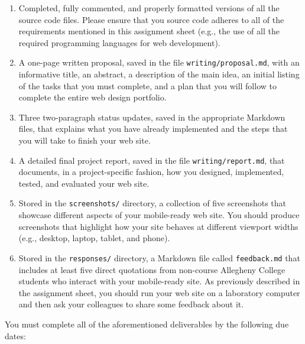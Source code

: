 \documentclass[11pt]{article}
\newcommand{\program}[1]{\lstinline{#1}}
\begin{document}
\begin{enumerate}

  \setlength{\itemsep}{0in}

\item Completed, fully commented, and properly formatted versions of all the
  source code files. Please ensure that you source code adheres to all of the
  requirements mentioned in this assignment sheet (e.g., the use of all the
  required programming languages for web development).

\item A one-page written proposal, saved in the file
  \program{writing/proposal.md}, with an informative title, an abstract, a
  description of the main idea, an initial listing of the tasks that you must
  complete, and a plan that you will follow to complete the entire web design
  portfolio.

\item Three two-paragraph status updates, saved in the appropriate Markdown
  files, that explains what you have already implemented and the steps that you
  will take to finish your web site.

\item A detailed final project report, saved in the file
  \program{writing/report.md}, that documents, in a project-specific fashion,
  how you designed, implemented, tested, and evaluated your web site.

\item Stored in the \program{screenshots/} directory, a collection of five
  screenshots that showcase different aspects of your mobile-ready web site.
  You should produce screenshots that highlight how your site behaves at
  different viewport widths (e.g., desktop, laptop, tablet, and phone).

\item Stored in the \program{responses/} directory, a Markdown file called
  \program{feedback.md} that includes at least five direct quotations from
  non-course Allegheny College students who interact with your mobile-ready
  site. As previously described in the assignment sheet, you should run your web
  site on a laboratory computer and then ask your colleagues to share some
  feedback about it.

\end{enumerate}

\noindent
You must complete all of the aforementioned deliverables by the following due dates:
\end{document}
